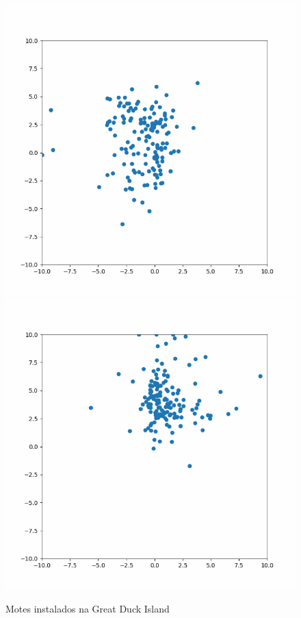 \documentclass[conference]{IEEEtran}
\begin{document}
\begin{figure}[htbp]
\begin{center}
    	\includegraphics[scale=0.3]{imagens-pso/particle-swarm-optimization-leader-moving-03.png}
    	\includegraphics[scale=0.3]{imagens-pso/particle-swarm-optimization-leader-moving-04.png}    	
    \caption{Motes instalados na Great Duck Island} \label{gdimotes}
    \end{center}
    \end{figure}
\end{document}
